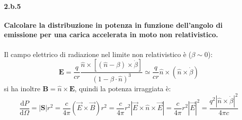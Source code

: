 \documentclass[twoside]{article}
\begin{document}
\paragraph{2.b.5}\textbf{Calcolare la distribuzione in potenza in funzione dell’angolo di emissione per una carica accelerata in moto non relativistico.}\\ \\
Il campo elettrico di radiazione nel limite non relativistico è ($\beta \sim 0$):
\begin{equation*}
    \mathbf{E}=\frac{q}{cr}\frac{\hat{n}\times[(\hat{n}-\beta)\times\dot{\beta}]}{(1-\beta\cdot\hat{n} )^3}\simeq\frac{q}{cr}\hat{n}\times(\hat{n}\times\dot{\beta})
\end{equation*}
si ha inoltre $\mathbf{B}=\hat{n}\times\mathbf{E}$, quindi la potenza irraggiata è:
\begin{equation*}
    \frac{\text{d}P}{\text{d}\Omega}=|\mathbf{S}|r^2=\frac{c}{4\pi}(\vec{E}\times \vec{B}) r^2= \frac{c}{4\pi}r^2 |\vec{E}\times\hat{n}\times\vec{E}|=\frac{c}{4\pi}r^2|\vec{E}|^2=\frac{q^2|\hat{n}\times\dot{\beta}|^2}{4\pi c}
\end{equation*}
\end{document}
